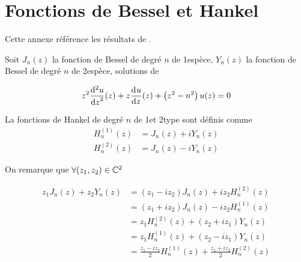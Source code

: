 \section{Fonctions de Bessel et Hankel}

Cette annexe référence les résultats de \cite{abramowitz_handbook_1964}.

Soit \(J_n(z)\) la fonction de Bessel de degré \(n\) de 1\iere espèce, \(Y_n(z)\) la fonction de Bessel de degré \(n\) de 2\ieme espèce, solutions de

\begin{equation}
    z^2 \ddp[2]{z}{u}(z) + z\ddp{z}{u}(z)+\left(z^2-n^2\right)u(z) = 0
\end{equation}

La fonctions de Hankel de degré \(n\) de 1\iere et 2\ieme type sont définis comme
\begin{align}
    H_n^{(1)}(z) &= J_n(z) + iY_n(z)\\
    H_n^{(2)}(z) &= J_n(z) - iY_n(z)
\end{align}

On remarque que \(\forall (z_1,z_2) \in \CC^2\)

\begin{equation}
\begin{aligned}
z_1 J_n(z) + z_2 Y_n(z)
&= ( z_1 - i z_2 ) J_n(z) + iz_2 H_n^{(2)}(z) \\
&= ( z_1 + i z_2 ) J_n(z) - iz_2 H_n^{(1)}(z) \\
&= z_1 H_n^{(2)}(z) + ( z_2 + i z_1 ) Y_n(z) \\
&= z_1 H_n^{(1)}(z) + ( z_2 - i z_1 ) Y_n(z) \\
&= \frac{z_1-iz_2}{2}H_n^{(1)}(z) + \frac{z_1+iz_2}{2}H_n^{(2)}(z)
\end{aligned}
\label{eq:annex:bessel:equiv_bessel}
\end{equation}